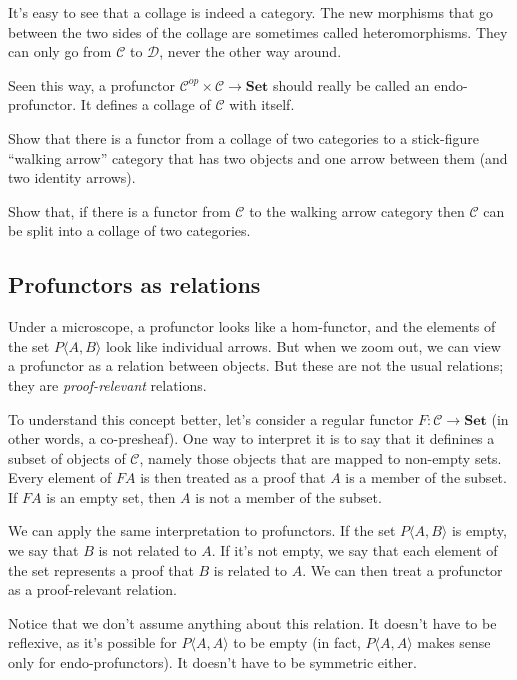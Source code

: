 \documentclass[DaoFP]{subfiles}
\begin{document}
It's easy to see that a collage is indeed a category. The new morphisms that go between the two sides of the collage are sometimes called heteromorphisms. They can only go from $\mathcal{C}$ to $\mathcal{D}$, never the other way around. 

Seen this way, a profunctor $ \mathcal{C}^{op} \times  \mathcal{C} \to \mathbf{Set}$ should really be called an endo-profunctor. It defines a collage of $\mathcal{C}$ with itself.

\begin{exercise}
Show that there is a functor from a collage of two categories to a stick-figure ``walking arrow'' category that has two objects and one arrow between them (and two identity arrows).
\end{exercise}
\begin{exercise}
Show that, if there is a functor from $\mathcal{C}$ to the walking arrow category then $\mathcal{C}$ can be split into a collage of two categories. 
\end{exercise}

\subsection{Profunctors as relations}

Under a microscope, a profunctor looks like a hom-functor, and the elements of the set $P \langle A, B \rangle$ look like individual arrows. But when we zoom out, we can view a profunctor as a relation between objects. But these are not the usual relations; they are \emph{proof-relevant} relations.

To understand this concept better, let's consider a regular functor $F \colon \mathcal{C} \to \mathbf{Set}$ (in other words, a co-presheaf). One way to interpret it is to say that it definines a subset of objects of $\mathcal{C}$, namely those objects that are mapped to non-empty sets. Every element of $F A$ is then treated as a proof that $A$ is a member of the subset. If $F A$ is an empty set, then $A$ is not a member of the subset.

We can apply the same interpretation to profunctors. If the set $P \langle A, B \rangle$ is empty, we say that $B$ is not related to $A$. If it's not empty, we say that each element of the set represents a proof that $B$ is related to $A$. We can then treat a profunctor as a proof-relevant relation. 

Notice that we don't assume anything about this relation. It doesn't have to be reflexive, as it's possible for $P \langle A, A \rangle$ to be empty (in fact, $P \langle A, A \rangle$ makes sense only for endo-profunctors). It doesn't have to be symmetric either.
\end{document}
